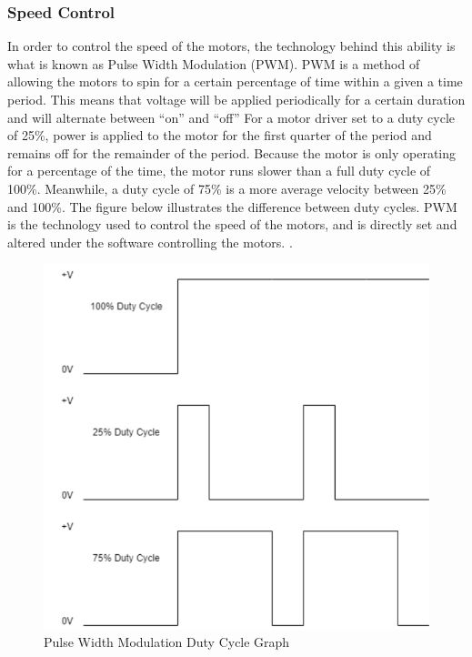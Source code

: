 \subsubsection{Speed Control}
\noindent In order to control the speed of the motors, the technology behind this ability is what is known as Pulse Width Modulation (PWM). PWM is a method of allowing the motors to spin for a certain percentage of time within a given a time period. This means that voltage will be applied periodically for a certain duration and will alternate between “on” and “off” For a motor driver set to a duty cycle of 25\%, power is applied to the motor for the first quarter of the period and remains off for the remainder of the period. Because the motor is only operating for a percentage of the time, the motor runs slower than a full duty cycle of 100\%. Meanwhile, a duty cycle of 75\% is a more average velocity between 25\% and 100\%. The figure below illustrates the difference between duty cycles. PWM is the technology used to control the speed of the motors, and is directly set and altered under the software controlling the motors. \cite{etechsparks}. \\

\begin{figure}[H]
	\centering
	\includegraphics[width=.65\textwidth]{./Images/pwm.png}
	\caption{\label{fig:pwm}Pulse Width Modulation Duty Cycle Graph}
\end{figure}



